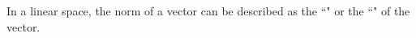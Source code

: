 \begin{liste}
\begin{enumerate}


%

\end{enumerate}



  \item In a linear space, the norm of a vector can be described as the ``"
        or the ``" of the vector.


\end{liste}
